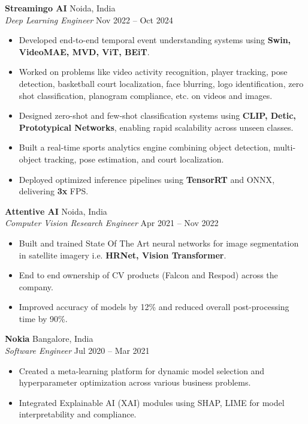 \documentclass[a4paper]{article}
\begin{document}
\textbf{Streamingo AI} \hfill Noida, India\\
\textit{Deep Learning Engineer} \hfill Nov 2022 -- Oct 2024
\begin{itemize} \itemsep 1pt
  \item Developed end-to-end temporal event understanding systems using \textbf{Swin, VideoMAE, MVD, ViT, BEiT}.
  \item Worked on problems like video activity recognition, player tracking, pose detection, basketball court localization, face blurring, logo identification, zero shot classification, planogram compliance, etc. on videos and images.
  \item Designed zero-shot and few-shot classification systems using \textbf{CLIP, Detic, Prototypical Networks}, enabling rapid scalability across unseen classes.
  \item Built a real-time sports analytics engine combining object detection, multi-object tracking, pose estimation, and court localization.
  \item Deployed optimized inference pipelines using \textbf{TensorRT} and {ONNX}, delivering \textbf{3x} FPS.
\end{itemize}

\textbf{Attentive AI} \hfill Noida, India\\
\textit{Computer Vision Research Engineer} \hfill Apr 2021 -- Nov 2022
\begin{itemize} \itemsep 1pt
	\item Built and trained State Of The Art neural networks for image segmentation in satellite imagery i.e.\textbf{ HRNet, Vision Transformer}.
	\item End to end ownership of CV products (Falcon and Respod) across the company.
	\item Improved accuracy of models by 12\% and reduced overall post-processing time by 90\%.
\end{itemize}

\textbf{Nokia} \hfill Bangalore, India\\
\textit{Software Engineer} \hfill Jul 2020 -- Mar 2021
\begin{itemize} \itemsep 1pt
  \item Created a meta-learning platform for dynamic model selection and hyperparameter optimization across various business problems.
  \item Integrated Explainable AI (XAI) modules using SHAP, LIME for model interpretability and compliance.
\end{itemize}
\end{document}
